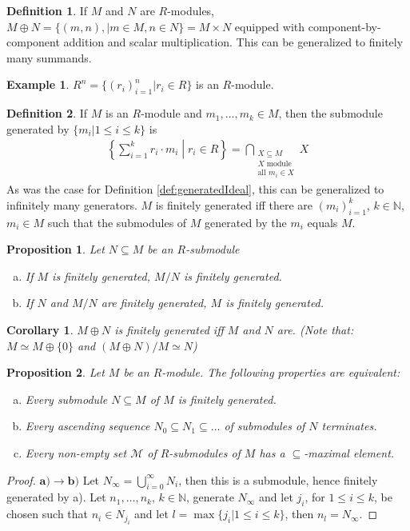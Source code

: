 \documentclass[DIV=14,parskip=half]{scrartcl}
\newtheorem{cor}{Corollary}[subsection]
\newtheorem{prop}{Proposition}[subsection]
\theoremstyle{definition}
\newtheorem{defi}{Definition}[subsection]
\newtheorem*{example}{Example}%
\newcommand{\N}{\mathbb{N}}
\begin{document}
\begin{defi}
 If $M$ and $N$ are $R$-modules, $M\oplus N = \{(m,n),|m\in M, n\in N\} = M\times N$ equipped with component-by-component addition and scalar multiplication. This can be generalized to finitely many summands.
\end{defi}
\begin{example} $R^n = \{(r_i)_{i=1}^n |r_i\in R\}$ is an $R$-module.
\end{example}
\begin{defi}\label{def:generatedModule}
 If $M$ is an $R$-module and $m_1,\dots,m_k\in M$, then the submodule generated by $\{m_i|1\leq i\leq k\}$ is
 \begin{align*}
  \left\{\sum_{i=1}^k r_i\cdot m_i \middle| r_i\in R\right\} = \bigcap_{\substack{X\subseteq M\\ X \text{ module}\\ \text{all } m_i\in X}} X
 \end{align*}
As was the case for Definition \ref{def:generatedIdeal}, this can be generalized to infinitely many generators. $M$ is finitely generated iff there are $(m_i)_{i=1}^k$, $k\in \N$, $m_i\in M$ such that the submodules of $M$ generated by the $m_i$ equals $M$.
\end{defi}
\begin{prop}
 Let $N\subseteq M$ be an $R$-submodule
 \begin{enumerate}[a)]
  \item If $M$ is finitely generated, $M/N$ is finitely generated.
  \item If $N$ and $M/N$ are finitely generated, $M$ is finitely generated.
 \end{enumerate}
 \end{prop}
 
\begin{cor}
 $M\oplus N$ is finitely generated iff $M$ and $N$ are. (Note that: $M\simeq M\oplus\{0\}$ and $(M\oplus N)/M \simeq N$)
\end{cor}
\begin{prop}\label{prop:NoetherianModule}
Let $M$ be an $R$-module. The following properties are equivalent:
\begin{enumerate}[a)]
 \item Every submodule $N\subseteq M$ of $M$ is finitely generated.
 \item Every ascending sequence $N_0\subseteq N_1\subseteq \dots$ of submodules of $N$ terminates.
 \item Every non-empty set $\mathcal{M}$ of $R$-submodules of $M$ has a $\subseteq$-maximal element.
\end{enumerate}
\end{prop}
\begin{proof}
$\mathbf{a)\to b)}$ Let $N_\infty = \bigcup_{i=0}^\infty N_i$, then this is a submodule, hence finitely generated by a). Let $n_1,\dots, n_k$, $k\in\N$, generate $N_\infty$ and let $j_i$, for $1\leq i \leq k$, be chosen such that $n_i\in N_{j_i}$ and let $l = \max\{j_i|1\leq i \leq k\}$, then $n_l = N_\infty$.

 
\end{proof}
\end{document}
